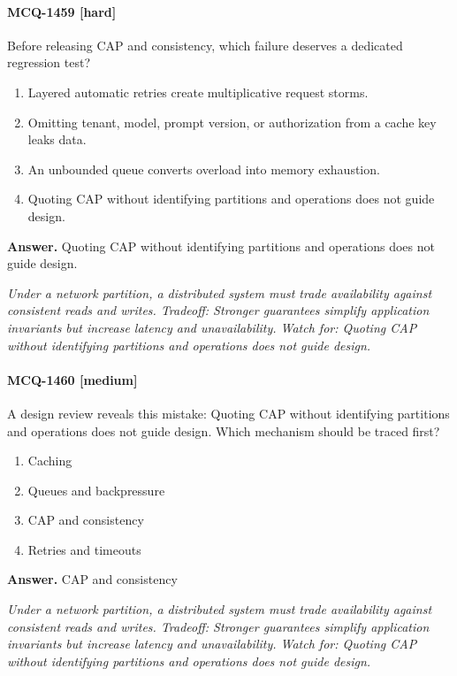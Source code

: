 \paragraph{MCQ-1459 [hard]} Before releasing CAP and consistency, which failure deserves a dedicated regression test?
\begin{enumerate}[label=\Alph*.]
\item Layered automatic retries create multiplicative request storms.
\item Omitting tenant, model, prompt version, or authorization from a cache key leaks data.
\item An unbounded queue converts overload into memory exhaustion.
\item Quoting CAP without identifying partitions and operations does not guide design.
\end{enumerate}
\noindent\textbf{Answer.} Quoting CAP without identifying partitions and operations does not guide design.
\par\textit{Under a network partition, a distributed system must trade availability against consistent reads and writes. Tradeoff: Stronger guarantees simplify application invariants but increase latency and unavailability. Watch for: Quoting CAP without identifying partitions and operations does not guide design.}
\paragraph{MCQ-1460 [medium]} A design review reveals this mistake: Quoting CAP without identifying partitions and operations does not guide design. Which mechanism should be traced first?
\begin{enumerate}[label=\Alph*.]
\item Caching
\item Queues and backpressure
\item CAP and consistency
\item Retries and timeouts
\end{enumerate}
\noindent\textbf{Answer.} CAP and consistency
\par\textit{Under a network partition, a distributed system must trade availability against consistent reads and writes. Tradeoff: Stronger guarantees simplify application invariants but increase latency and unavailability. Watch for: Quoting CAP without identifying partitions and operations does not guide design.}
